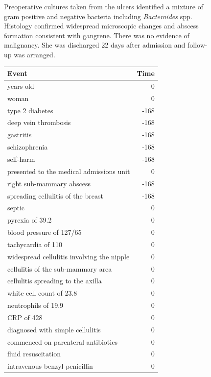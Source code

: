 \begin{figure}[htbp]
\begin{ChSixFloatBody}
\begin{tcolorbox}
\begin{minipage}[t]{0.48\textwidth}
\begin{tcolorbox}[
  enhanced,
  colback=blue!3,
  colframe=blue!60!black,
  title=\textbf{PMC3184014},
  fonttitle=\small,
  boxrule=0.8pt,
  arc=2mm,
  left=3mm,right=3mm,top=2mm,bottom=2mm
]
Preoperative cultures taken from the ulcers identified a mixture of gram positive and negative bacteria including \textit{Bacteroides} spp. Histology confirmed widespread microscopic changes and abscess formation consistent with gangrene. There was no evidence of malignancy. She was discharged 22 days after admission and follow-up was arranged.
\end{tcolorbox}
\end{minipage}
\hfill
\begin{minipage}[t]{0.48\textwidth}\vspace{0pt}
\begin{tcolorbox}[ChSix/annobox,title={T2S2 annotation}]
\ChSixAnnotationTableStyle
\begin{tabular}{>{\raggedright\arraybackslash}p{} r}
\toprule
\textbf{Event} & \textbf{Time} \\
\midrule
39 years old & 0 \\
woman & 0 \\
type 2 diabetes & -168 \\
deep vein thrombosis & -168 \\
gastritis & -168 \\
schizophrenia & -168 \\
self-harm & -168 \\
presented to the medical admissions unit & 0 \\
right sub-mammary abscess & -168 \\
spreading cellulitis of the breast & -168 \\
septic & 0 \\
pyrexia of 39.2 & 0 \\
blood pressure of 127/65 & 0 \\
tachycardia of 110 & 0 \\
widespread cellulitis involving the nipple & 0 \\
cellulitis of the sub-mammary area & 0 \\
cellulitis spreading to the axilla & 0 \\
white cell count of 23.8 & 0 \\
neutrophils of 19.9 & 0 \\
CRP of 428 & 0 \\
diagnosed with simple cellulitis & 0 \\
commenced on parenteral antibiotics & 0 \\
fluid resuscitation & 0 \\
intravenous benzyl penicillin & 0 \\

\end{tabular}
\end{tcolorbox}
\end{minipage}
\end{tcolorbox}
\end{ChSixFloatBody}
\end{figure}
